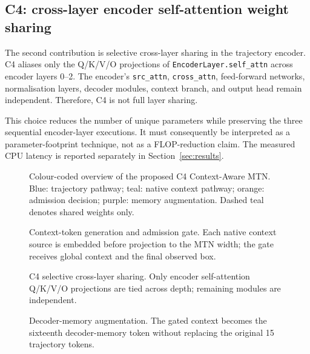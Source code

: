 \subsection{C4: cross-layer encoder self-attention weight sharing}
\label{sec:c4}
The second contribution is selective cross-layer sharing in the trajectory encoder. C4 aliases only the Q/K/V/O projections of \texttt{EncoderLayer.self\_attn} across encoder layers 0--2. The encoder's \texttt{src\_attn}, \texttt{cross\_attn}, feed-forward networks, normalisation layers, decoder modules, context branch, and output head remain independent. Therefore, C4 is not full layer sharing.

This choice reduces the number of unique parameters while preserving the three sequential encoder-layer executions. It must consequently be interpreted as a parameter-footprint technique, not as a FLOP-reduction claim. The measured CPU latency is reported separately in Section~\ref{sec:results}.

\begin{figure}[t]
\centering
\resizebox{\textwidth}{!}{}
\caption{Colour-coded overview of the proposed C4 Context-Aware MTN. Blue: trajectory pathway; teal: native context pathway; orange: admission decision; purple: memory augmentation. Dashed teal denotes shared weights only.}
\label{fig:c4-overview}
\end{figure}

\begin{figure}[t]
\centering
\resizebox{\textwidth}{!}{}
\caption{Context-token generation and admission gate. Each native context source is embedded before projection to the MTN width; the gate receives global context and the final observed box.}
\label{fig:c4-context-gate}
\end{figure}

\begin{figure}[t]
\centering
\resizebox{\textwidth}{!}{}
\caption{C4 selective cross-layer sharing. Only encoder self-attention Q/K/V/O projections are tied across depth; remaining modules are independent.}
\label{fig:c4-sharing}
\end{figure}

\begin{figure}[t]
\centering
\resizebox{\textwidth}{!}{}
\caption{Decoder-memory augmentation. The gated context becomes the sixteenth decoder-memory token without replacing the original 15 trajectory tokens.}
\label{fig:c4-memory}
\end{figure}

